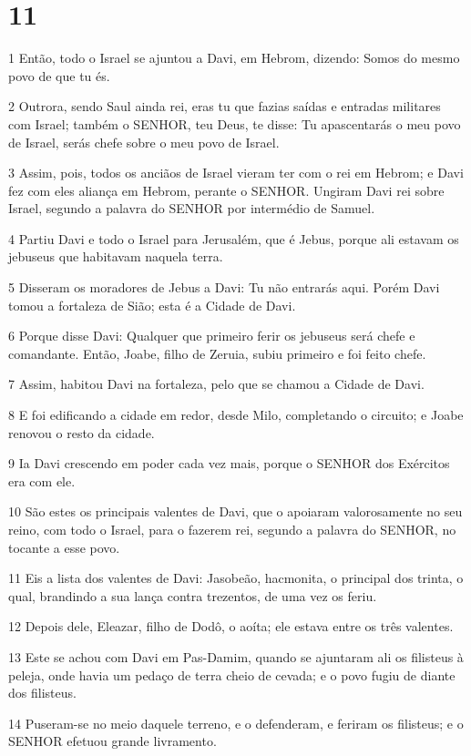 \chapter{11}

\par 1 Então, todo o Israel se ajuntou a Davi, em Hebrom, dizendo: Somos do mesmo povo de que tu és.
\par 2 Outrora, sendo Saul ainda rei, eras tu que fazias saídas e entradas militares com Israel; também o SENHOR, teu Deus, te disse: Tu apascentarás o meu povo de Israel, serás chefe sobre o meu povo de Israel.
\par 3 Assim, pois, todos os anciãos de Israel vieram ter com o rei em Hebrom; e Davi fez com eles aliança em Hebrom, perante o SENHOR. Ungiram Davi rei sobre Israel, segundo a palavra do SENHOR por intermédio de Samuel.
\par 4 Partiu Davi e todo o Israel para Jerusalém, que é Jebus, porque ali estavam os jebuseus que habitavam naquela terra.
\par 5 Disseram os moradores de Jebus a Davi: Tu não entrarás aqui. Porém Davi tomou a fortaleza de Sião; esta é a Cidade de Davi.
\par 6 Porque disse Davi: Qualquer que primeiro ferir os jebuseus será chefe e comandante. Então, Joabe, filho de Zeruia, subiu primeiro e foi feito chefe.
\par 7 Assim, habitou Davi na fortaleza, pelo que se chamou a Cidade de Davi.
\par 8 E foi edificando a cidade em redor, desde Milo, completando o circuito; e Joabe renovou o resto da cidade.
\par 9 Ia Davi crescendo em poder cada vez mais, porque o SENHOR dos Exércitos era com ele.
\par 10 São estes os principais valentes de Davi, que o apoiaram valorosamente no seu reino, com todo o Israel, para o fazerem rei, segundo a palavra do SENHOR, no tocante a esse povo.
\par 11 Eis a lista dos valentes de Davi: Jasobeão, hacmonita, o principal dos trinta, o qual, brandindo a sua lança contra trezentos, de uma vez os feriu.
\par 12 Depois dele, Eleazar, filho de Dodô, o aoíta; ele estava entre os três valentes.
\par 13 Este se achou com Davi em Pas-Damim, quando se ajuntaram ali os filisteus à peleja, onde havia um pedaço de terra cheio de cevada; e o povo fugiu de diante dos filisteus.
\par 14 Puseram-se no meio daquele terreno, e o defenderam, e feriram os filisteus; e o SENHOR efetuou grande livramento.
